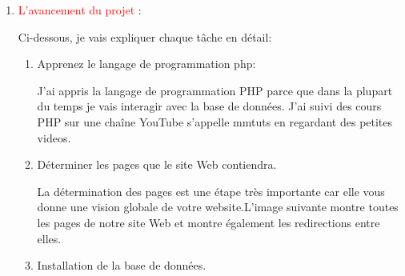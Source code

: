 \documentclass{article}
\begin{document}
\begin{enumerate}
   
   
   
   
   
   \item \textcolor{red}{\huge L'avancement du projet} :
   
    Ci-dessous, je vais expliquer chaque tâche en détail:
        
        \begin{enumerate}
        \item \textcolor{amethyst}{Apprenez le langage de programmation php}:
        
        \vspace{0.4cm}
            \setlength{\parindent}{1cm} J'ai appris la langage de programmation PHP parce que dans la plupart du temps je vais interagir avec la base de données.
            J'ai suivi des cours PHP sur une chaîne YouTube s'appelle mmtuts en regardant des petites videos.     
            
        \item \textcolor{amethyst}{Déterminer les pages que le site Web contiendra}.
            
            \vspace{0.4cm}
                \setlength{\parindent}{1cm} La détermination des pages est une étape très importante car elle vous donne une vision globale de votre website.L'image suivante montre toutes les pages de notre site Web et montre également les redirections entre elles.
                
               \vspace{0.6cm}
               \hspace*{-1.05in}
               \noindent{}
                \vspace{0.6cm}
                 \item \textcolor{amethyst}{Installation de la base de données}.
           \vspace{0.4cm}
           

\end{enumerate}
\end{enumerate}
\end{document}
